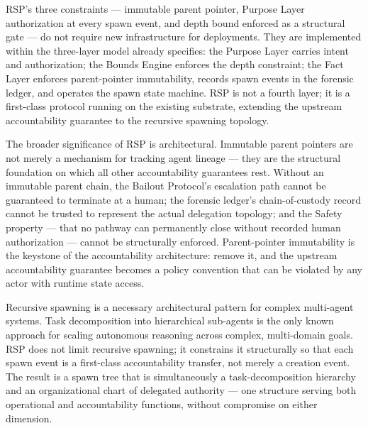 RSP's three constraints — immutable parent pointer, Purpose Layer authorization at every spawn event, and depth bound enforced as a structural gate — do not require new infrastructure for \bxthree{} deployments. They are implemented within the three-layer model \bxthree{} already specifies: the Purpose Layer carries intent and authorization; the Bounds Engine enforces the depth constraint; the Fact Layer enforces parent-pointer immutability, records spawn events in the forensic ledger, and operates the spawn state machine. RSP is not a fourth layer; it is a first-class protocol running on the existing substrate, extending the upstream accountability guarantee to the recursive spawning topology.

The broader significance of RSP is architectural. Immutable parent pointers are not merely a mechanism for tracking agent lineage — they are the structural foundation on which all other accountability guarantees rest. Without an immutable parent chain, the Bailout Protocol's escalation path cannot be guaranteed to terminate at a human; the forensic ledger's chain-of-custody record cannot be trusted to represent the actual delegation topology; and the Safety property — that no pathway can permanently close without recorded human authorization — cannot be structurally enforced. Parent-pointer immutability is the keystone of the \bxthree{} accountability architecture: remove it, and the upstream accountability guarantee becomes a policy convention that can be violated by any actor with runtime state access.

Recursive spawning is a necessary architectural pattern for complex multi-agent systems. Task decomposition into hierarchical sub-agents is the only known approach for scaling autonomous reasoning across complex, multi-domain goals. RSP does not limit recursive spawning; it constrains it structurally so that each spawn event is a first-class accountability transfer, not merely a creation event. The result is a spawn tree that is simultaneously a task-decomposition hierarchy and an organizational chart of delegated authority — one structure serving both operational and accountability functions, without compromise on either dimension.